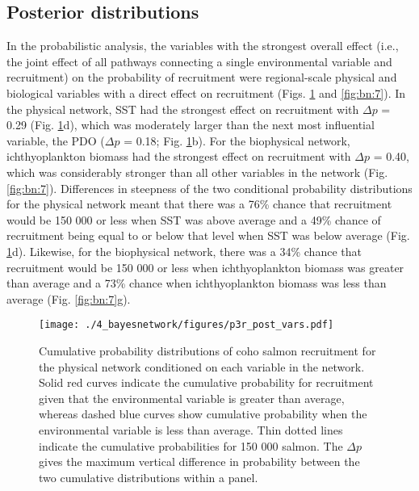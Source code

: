\subsection{Posterior distributions}

In the probabilistic analysis, the variables with the strongest overall effect
(i.e., the joint effect of all pathways connecting a single environmental
variable and recruitment) on the probability of recruitment were regional-scale
physical and biological variables with a direct effect on recruitment (Figs.
\ref{fig:bn:6} and \ref{fig:bn:7}). In the physical network, SST had the
strongest effect on recruitment with \(\Delta p\) = 0.29 (Fig.
\ref{fig:bn:6}d), which was moderately larger than the next most influential
variable, the PDO (\(\Delta p\) = 0.18; Fig. \ref{fig:bn:6}b). For the
biophysical network, ichthyoplankton biomass had the strongest effect on
recruitment with \(\Delta p\) = 0.40, which was considerably stronger than all
other variables in the network (Fig. \ref{fig:bn:7}). Differences in steepness
of the two conditional probability distributions for the physical network meant
that there was a 76\% chance that recruitment would be 150 000 or less when SST
was above average and a 49\% chance of recruitment being equal to or below that
level when SST was below average (Fig. \ref{fig:bn:6}d). Likewise, for the
biophysical network, there was a 34\% chance that recruitment would be 150 000
or less when ichthyoplankton biomass was greater than average and a 73\% chance
when ichthyoplankton biomass was less than average (Fig. \ref{fig:bn:7}g).

\begin{figure}[htbp]
  \centering \texttt{[image: ./4\_bayesnetwork/figures/p3r\_post\_vars.pdf]}
  \caption[Cumulative probability distributions of coho salmon recruitment for
           the physical network conditioned on each variable in the
           network]{Cumulative probability distributions of coho salmon
           recruitment for the physical network conditioned on each variable in
           the network. Solid red curves indicate the cumulative probability
           for recruitment given that the environmental variable is greater than
           average, whereas dashed blue curves show cumulative probability when
           the environmental variable is less than average. Thin dotted lines
           indicate the cumulative probabilities for 150 000 salmon. The
           \(\Delta p\) gives the maximum vertical difference in probability
           between the two cumulative distributions within a panel.}
  \label{fig:bn:6}
\end{figure}

